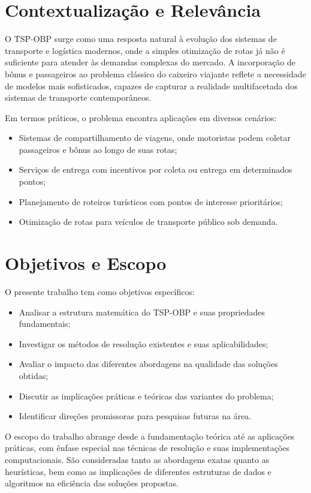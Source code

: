 \documentclass[12pt, a4paper]{report}
\begin{document}
\section{Contextualização e Relevância}

O TSP-OBP surge como uma resposta natural à evolução dos sistemas de transporte e logística modernos, onde a simples otimização de rotas já não é suficiente para atender às demandas complexas do mercado. A incorporação de bônus e passageiros ao problema clássico do caixeiro viajante reflete a necessidade de modelos mais sofisticados, capazes de capturar a realidade multifacetada dos sistemas de transporte contemporâneos.

Em termos práticos, o problema encontra aplicações em diversos cenários:
\begin{itemize}
    \item Sistemas de compartilhamento de viagens, onde motoristas podem coletar passageiros e bônus ao longo de suas rotas;
    \item Serviços de entrega com incentivos por coleta ou entrega em determinados pontos;
    \item Planejamento de roteiros turísticos com pontos de interesse prioritários;
    \item Otimização de rotas para veículos de transporte público sob demanda.
\end{itemize}

\section{Objetivos e Escopo}

O presente trabalho tem como objetivos específicos:
\begin{itemize}
    \item Analisar a estrutura matemática do TSP-OBP e suas propriedades fundamentais;
    \item Investigar os métodos de resolução existentes e suas aplicabilidades;
    \item Avaliar o impacto das diferentes abordagens na qualidade das soluções obtidas;
    \item Discutir as implicações práticas e teóricas das variantes do problema;
    \item Identificar direções promissoras para pesquisas futuras na área.
\end{itemize}

O escopo do trabalho abrange desde a fundamentação teórica até as aplicações práticas, com ênfase especial nas técnicas de resolução e suas implementações computacionais. São consideradas tanto as abordagens exatas quanto as heurísticas, bem como as implicações de diferentes estruturas de dados e algoritmos na eficiência das soluções propostas.
\end{document}
